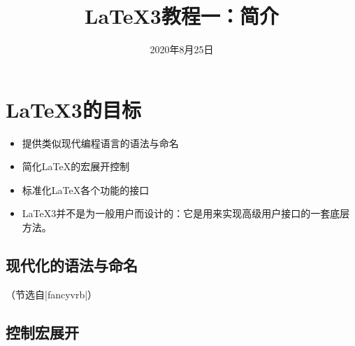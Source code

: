 \documentclass[aspectratio=169]{beamer}
\title{\LaTeX3教程一：简介}
\date{2020年8月25日}
\begin{document}
\maketitle


\section{\LaTeX3的目标}


\begin{frame}[fragile]

\begin{itemize}
\item 提供类似现代编程语言的语法与命名
\item 简化\LaTeX 的宏展开控制
\item 标准化\LaTeX 各个功能的接口
\end{itemize}
\vspace*{1em}
\begin{itemize}
\item \LaTeX3并不是为一般用户而设计的：它是用来实现高级用户接口的一套底层方法。
\end{itemize}

\end{frame}


\subsection{现代化的语法与命名}

\begin{frame}[fragile]



（节选自\textinl|fancyvrb|）

\end{frame}

\subsection{控制宏展开}
\end{document}
